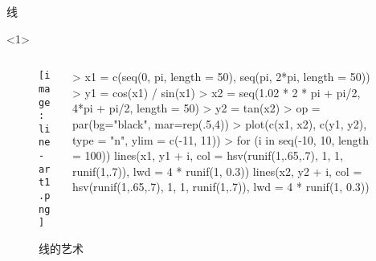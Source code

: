 

\begin{frame}{\subsecname}{线}
\begin{onlyenv}<1>
\begin{figure}
  \begin{columns}
    \begin{column}[c]{.4\textwidth}
        \texttt{[image: line-art1.png]}
    \end{column}

    \begin{column}[c]{.6\textwidth}
\begin{rcode}
> x1 = c(seq(0, pi, length = 50), seq(pi, 2*pi, length = 50))
> y1 = cos(x1) / sin(x1)
> x2 = seq(1.02 * 2 * pi + pi/2, 4*pi + pi/2, length = 50)
> y2 = tan(x2)
> op = par(bg="black", mar=rep(.5,4))
> plot(c(x1, x2), c(y1, y2), type = "n", ylim = c(-11, 11))
> for (i in seq(-10, 10, length = 100)){
  lines(x1, y1 + i, col = hsv(runif(1,.65,.7), 1, 1, runif(1,.7)), lwd = 4 * runif(1, 0.3))
  lines(x2, y2 + i, col = hsv(runif(1,.65,.7), 1, 1, runif(1,.7)), lwd = 4 * runif(1, 0.3))
}
\end{rcode}
    \end{column}
  \end{columns}
  \caption{线的艺术}
\end{figure}
\end{onlyenv} 
\end{frame}

